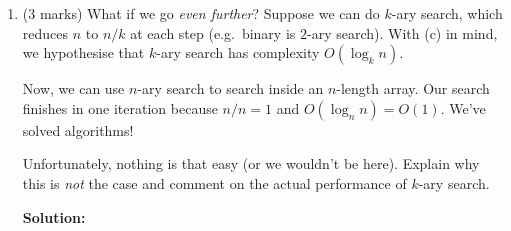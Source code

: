 \documentclass[a4,13pt]{extarticle}
\newenvironment{Solution}{\color{blue}\textbf{Solution:}}{}
\begin{document}
\begin{enumerate}
\begin{enumerate}
	      	\item (3 marks) What if we go \textit{even further}? Suppose we can do $k$-ary search, which reduces $n$ to $n/k$ at each step (e.g.\ binary is $2$-ary search). With (c) in mind, we hypothesise that $k$-ary search has complexity $O(\log_k n)$.
	      	      	      	                  
	      	      Now, we can use $n$-ary search to search inside an $n$-length array. Our search finishes in one iteration because $n/n=1$ and $O(\log_n n) = O(1)$. We've solved algorithms! 
	      	      	      	                  
	      	      Unfortunately, nothing is that easy (or we wouldn't be here). Explain why this is \textit{not} the case and comment on the actual performance of $k$-ary search.
	      	      
	      	\begin{Solution}
	      	\end{Solution}
	      	      	      	                  
	      \end{enumerate}
	      	          
\end{enumerate}
\end{document}
